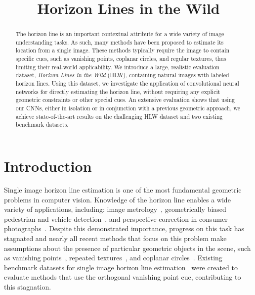 \documentclass{bmvc2k}
\title{Horizon Lines in the Wild}
\begin{document}
\maketitle

\begin{abstract}

The horizon line is an important contextual attribute for a wide
variety of image understanding tasks. As such, many methods have been
proposed to estimate its location from a single image. These methods
typically require the image to contain specific cues, such as
vanishing points, coplanar circles, and regular textures, thus limiting
their real-world applicability.  We introduce a large, realistic
evaluation dataset, {\em Horizon Lines in the Wild} (HLW), containing
natural images with labeled horizon lines.  Using this dataset, we
investigate the application of convolutional neural networks for
directly estimating the horizon line, without requiring any explicit
geometric constraints or other special cues. An extensive evaluation
shows that using our CNNs, either in isolation or in conjunction with
a previous geometric approach, we achieve state-of-the-art results on
the challenging HLW dataset and two existing benchmark datasets.

\end{abstract}

\section{Introduction}

Single image horizon line estimation is one of the most fundamental
geometric problems in computer vision. Knowledge of the horizon line
enables a wide variety of applications, including: image
metrology~\cite{criminisi2000single}, geometrically biased pedestrian
and vehicle detection~\cite{hoiem2008putting}, and perspective
correction in consumer photographs~\cite{lee2012automatic}. 
Despite this demonstrated importance, progress on this task
has stagnated and nearly all recent methods that focus on
this problem make assumptions about the presence of particular
geometric objects in the scene, such as vanishing
points~\cite{tardif2009non,xu2013minimum,lezama2014finding},
repeated textures~\cite{criminisi2000texture}, and coplanar
circles~\cite{chen2004camera}. Existing
benchmark datasets for single image horizon line
estimation~\cite{barinova2010geometric,denis2008efficient} were
created to evaluate methods that use the orthogonal vanishing point
cue, contributing to this
stagnation. 
\end{document}
